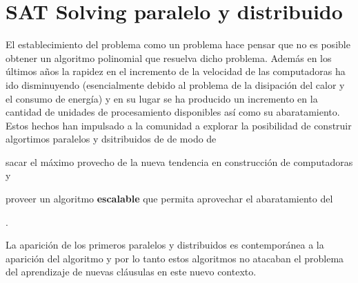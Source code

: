 \section{SAT Solving paralelo y distribuido}

El establecimiento del problema \sat como un problema \npc hace pensar que no es
posible obtener un algoritmo polinomial que resuelva dicho problema. Además en
los últimos años la rapidez en el incremento de la velocidad de las computadoras
ha ido disminuyendo (esencialmente debido al problema de la disipación del calor
y el consumo de energía) y en su lugar se ha producido un incremento en la
cantidad de unidades de procesamiento disponibles así como su abaratamiento.
Estos hechos han impulsado a la comunidad \sat a explorar la posibilidad de
construir algortimos paralelos y dsitribuidos de \ssolving de modo de
\begin{inparaenum}[a)] \item sacar el máximo provecho de la nueva tendencia en
construcción de computadoras y \item proveer un algoritmo \textbf{escalable} que
permita aprovechar el abaratamiento del \hard \end{inparaenum}.

La aparición de los primeros \ssolvers paralelos y distribuidos
\cite{bohm:1996:afast, zhang:jsc-1996} es contemporánea a la aparición del
algoritmo \CDCL y por lo tanto estos algoritmos no atacaban el problema del
aprendizaje de nuevas cláusulas en este nuevo contexto.
